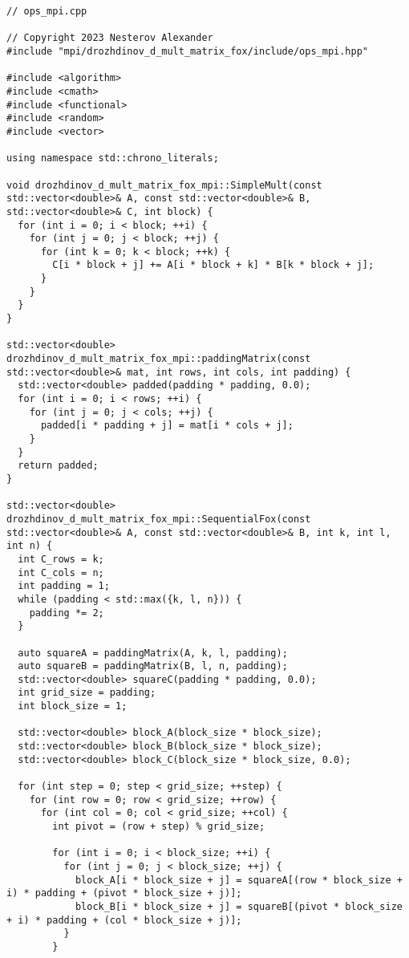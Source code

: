 \documentclass{report}
\begin{document}
\begin{lstlisting}
// ops_mpi.cpp

// Copyright 2023 Nesterov Alexander
#include "mpi/drozhdinov_d_mult_matrix_fox/include/ops_mpi.hpp"

#include <algorithm>
#include <cmath>
#include <functional>
#include <random>
#include <vector>

using namespace std::chrono_literals;

void drozhdinov_d_mult_matrix_fox_mpi::SimpleMult(const std::vector<double>& A, const std::vector<double>& B, std::vector<double>& C, int block) {
  for (int i = 0; i < block; ++i) {
    for (int j = 0; j < block; ++j) {
      for (int k = 0; k < block; ++k) {
        C[i * block + j] += A[i * block + k] * B[k * block + j];
      }
    }
  }
}

std::vector<double> drozhdinov_d_mult_matrix_fox_mpi::paddingMatrix(const std::vector<double>& mat, int rows, int cols, int padding) {
  std::vector<double> padded(padding * padding, 0.0);
  for (int i = 0; i < rows; ++i) {
    for (int j = 0; j < cols; ++j) {
      padded[i * padding + j] = mat[i * cols + j];
    }
  }
  return padded;
}

std::vector<double> drozhdinov_d_mult_matrix_fox_mpi::SequentialFox(const std::vector<double>& A, const std::vector<double>& B, int k, int l, int n) {
  int C_rows = k;
  int C_cols = n;
  int padding = 1;
  while (padding < std::max({k, l, n})) {
    padding *= 2;
  }

  auto squareA = paddingMatrix(A, k, l, padding);
  auto squareB = paddingMatrix(B, l, n, padding);
  std::vector<double> squareC(padding * padding, 0.0);
  int grid_size = padding;
  int block_size = 1;

  std::vector<double> block_A(block_size * block_size);
  std::vector<double> block_B(block_size * block_size);
  std::vector<double> block_C(block_size * block_size, 0.0);

  for (int step = 0; step < grid_size; ++step) {
    for (int row = 0; row < grid_size; ++row) {
      for (int col = 0; col < grid_size; ++col) {
        int pivot = (row + step) % grid_size;

        for (int i = 0; i < block_size; ++i) {
          for (int j = 0; j < block_size; ++j) {
            block_A[i * block_size + j] = squareA[(row * block_size + i) * padding + (pivot * block_size + j)];
            block_B[i * block_size + j] = squareB[(pivot * block_size + i) * padding + (col * block_size + j)];
          }
        }


\end{lstlisting}
\end{document}
